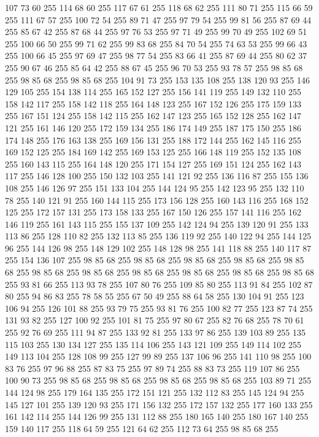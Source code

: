 107 73 60 255 114 68 60 255 117 67 61 255 118 68 62 255 111 80 71 255 115 66 59 255 111 67 57 255 100 72 54 255 89 71 47 255 97 79 54 255 99 81 56 255 87 69 44 255 85 67 42 255 87 68 44 255 97 76 53 255 97 71 49 255 99 70 49 255 102 69 51 255 100 66 50 255 99 71 62 255 99 83 68 255 84 70 54 255 74 63 53 255 99 66 43 255 100 66 45 255 97 69 47 255 98 77 54 255 83 66 41 255 87 69 44 255 80 62 37 255 90 67 46 255 85 64 42 255 88 67 45 255 96 70 53 255 93 78 57 255 98 85 68 255 98 85 68 255 98 85 68 255 104 91 73 255 153 135 108 255 138 120 93 255 146 129 105 255 154 138 114 255 165 152 127 255 156 141 119 255 149 132 110 255 158 142 117 255 158 142 118 255 164 148 123 255 167 152 126 255 175 159 133 255 167 151 124 255 158 142 115 255 162 147 123 255 165 152 128 255 162 147 121 255 161 146 120 255 172 159 134 255 186 174 149 255 187 175 150 255 186 174 148 255 176 163 138 255 169 156 131 255 188 172 144 255
162 145 116 255 169 152 125 255 184 169 142 255 169 153 125 255 166 148 119 255 152 135 108 255 160 143 115 255 164 148 120 255 171 154 127 255 169 151 124 255 162 143 117 255 146 128 100 255 150 132 103 255 141 121 92 255 136 116 87 255 155 136 108 255 146 126 97 255 151 133 104 255 144 124 95 255 142 123 95 255 132 110 78 255 140 121 91 255 160 144 115 255 173 156 128 255 160 143 116 255 168 152 125 255 172 157 131 255 173 158 133 255 167 150 126 255 157 141 116 255 162 146 119 255 161 143 115 255 155 137 109 255 142 124 94 255 139 120 91 255 133 113 86 255 128 110 82 255 132 113 85 255 136 119 92 255 140 122 94 255 144 125 96 255 144 126 98 255 148 129 102 255 148 128 98 255 141 118 88 255 140 117 87 255 154 136 107 255 98 85 68 255 98 85 68 255 98 85 68 255 98 85 68 255 98 85 68 255 98 85 68 255 98 85 68 255 98 85 68 255 98 85 68 255 98 85 68 255 98 85 68 255 93 81 66 255 113 93 78 255 107 80 76 255 109 85 80 255 113 91 84 255 102 87 80 255
94 86 83 255 78 58 55 255 67 50 49 255 88 64 58 255 130 104 91 255 123 106 94 255 126 101 88 255 93 79 75 255 93 81 76 255 100 82 77 255 123 87 74 255 131 93 82 255 127 100 92 255 101 81 75 255 97 80 67 255 82 76 68 255 78 70 61 255 92 76 69 255 111 94 87 255 133 92 81 255 133 97 86 255 139 103 89 255 135 115 103 255 130 134 127 255 135 114 106 255 143 121 109 255 149 114 102 255 149 113 104 255 128 108 99 255 127 99 89 255 137 106 96 255 141 110 98 255 100 83 76 255 97 96 88 255 87 83 75 255 97 89 74 255 88 83 73 255 119 107 86 255 100 90 73 255 98 85 68 255 98 85 68 255 98 85 68 255 98 85 68 255 103 89 71 255 144 124 98 255 179 164 135 255 172 151 121 255 132 112 83 255 145 124 94 255 145 127 101 255 139 120 93 255 171 156 132 255 172 157 132 255 177 160 133 255 161 142 114 255 144 126 99 255 131 112 88 255 180 165 140 255 180 167 140 255 159 140 117 255 118 64 59 255 121 64 62 255 112 73 64 255 98 85 68 255
